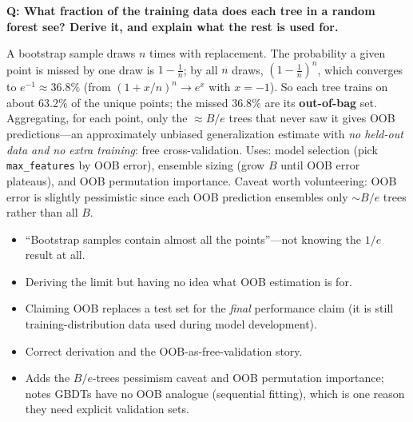 \begin{interviewq}
\textbf{Q: What fraction of the training data does each tree in a random forest see? Derive it, and explain what the rest is used for.}

 \quad {} \quad \badgefreq{\freqmed}

\stronganswer

A bootstrap sample draws $n$ times with replacement. The probability a given point is missed by one draw is $1 - \tfrac{1}{n}$; by all $n$ draws, $(1 - \tfrac{1}{n})^n$, which converges to $e^{-1} \approx 36.8\%$ (from $(1+x/n)^n \to e^x$ with $x = -1$). So each tree trains on about $63.2\%$ of the unique points; the missed $36.8\%$ are its \textbf{out-of-bag} set. Aggregating, for each point, only the $\approx B/e$ trees that never saw it gives OOB predictions---an approximately unbiased generalization estimate with \textit{no held-out data and no extra training}: free cross-validation. Uses: model selection (pick \texttt{max\_features} by OOB error), ensemble sizing (grow $B$ until OOB error plateaus), and OOB permutation importance. Caveat worth volunteering: OOB error is slightly pessimistic since each OOB prediction ensembles only $\sim B/e$ trees rather than all $B$.

\redflags
\begin{itemize}
    \item ``Bootstrap samples contain almost all the points''---not knowing the $1/e$ result at all.
    \item Deriving the limit but having no idea what OOB estimation is for.
    \item Claiming OOB replaces a test set for the \textit{final} performance claim (it is still training-distribution data used during model development).
\end{itemize}


\goodgreat
\begin{itemize}
    \item {} Correct derivation and the OOB-as-free-validation story.
    \item {} Adds the $B/e$-trees pessimism caveat and OOB permutation importance; notes GBDTs have no OOB analogue (sequential fitting), which is one reason they need explicit validation sets.
\end{itemize}

\end{interviewq}

